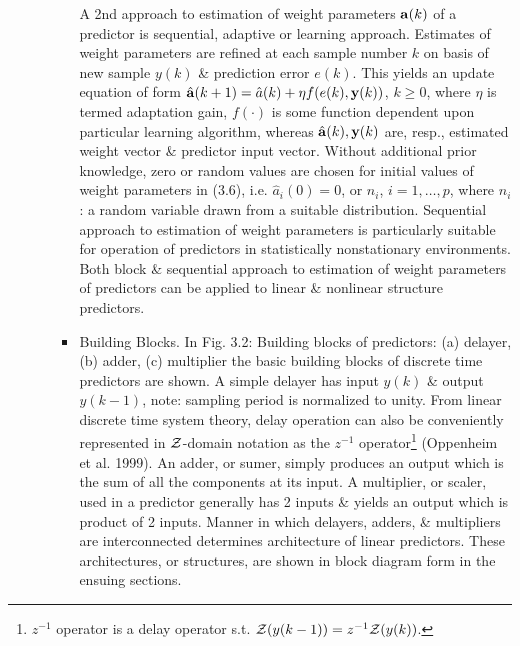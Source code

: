 \documentclass{article}
\begin{document}
\begin{enumerate}
\begin{itemize}
\begin{itemize}
			A 2nd approach to estimation of weight parameters ${\bf a}(k)$ of a predictor is sequential, adaptive or learning approach. Estimates of weight parameters are refined at each sample number $k$ on basis of new sample $y(k)$ \& prediction error $e(k)$. This yields an update equation of form $\hat{\bf a}(k + 1) = \hat{a}(k) + \eta f(e(k),{\bf y}(k))$, $k\ge0$, where $\eta$ is termed adaptation gain, $f(\cdot)$ is some function dependent upon particular learning algorithm, whereas $\hat{\bf a}(k),{\bf y}(k)$ are, resp., estimated weight vector \& predictor input vector. Without additional prior knowledge, zero or random values are chosen for initial values of weight parameters in (3.6), i.e. $\hat{a}_i(0) = 0$, or $n_i$, $i = 1,\ldots,p$, where $n_i$: a random variable drawn from a suitable distribution. Sequential approach to estimation of weight parameters is particularly suitable for operation of predictors in statistically nonstationary environments. Both block \& sequential approach to estimation of weight parameters of predictors can be applied to linear \& nonlinear structure predictors.
			\item {\sf Building Blocks.} In {\sf Fig. 3.2: Building blocks of predictors: (a) delayer, (b) adder, (c) multiplier} the basic building blocks of discrete time predictors are shown. A simple delayer has input $y(k)$ \& output $y(k - 1)$, note: sampling period is normalized to unity. From linear discrete time system theory, delay operation can also be conveniently represented in ${\cal Z}$-domain notation as the $z^{-1}$ operator\footnote{$z^{-1}$ operator is a delay operator s.t. ${\cal Z}(y(k - 1)) = z^{-1}{\cal Z}(y(k))$.} (Oppenheim et al. 1999). An adder, or sumer, simply produces an output which is the sum of all the components at its input. A multiplier, or scaler, used in a predictor generally has 2 inputs \& yields an output which is product of 2 inputs. Manner in which delayers, adders, \& multipliers are interconnected determines architecture of linear predictors. These architectures, or structures, are shown in block diagram form in the ensuing sections.
			

\end{itemize}
\end{itemize}
\end{enumerate}
\end{document}
